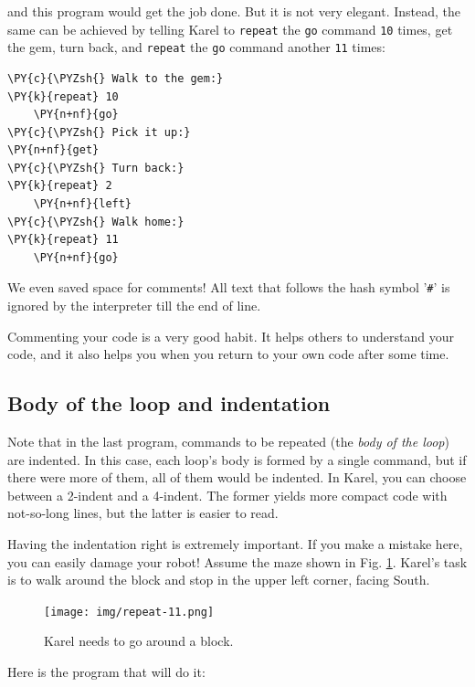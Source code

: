 \noindent
and this program would get the job done. But it is not very elegant. 
Instead, the same can be achieved by telling Karel to {\tt repeat} the {\tt go} 
command {\tt 10} times, get the gem, turn back, and  {\tt repeat} the {\tt go} 
command another {\tt 11} times:\\

\begin{bbox}
\begin{Verbatim}[commandchars=\\\{\}]
\PY{c}{\PYZsh{} Walk to the gem:}
\PY{k}{repeat} 10
    \PY{n+nf}{go}
\PY{c}{\PYZsh{} Pick it up:}
\PY{n+nf}{get}
\PY{c}{\PYZsh{} Turn back:}
\PY{k}{repeat} 2
    \PY{n+nf}{left}
\PY{c}{\PYZsh{} Walk home:}
\PY{k}{repeat} 11
    \PY{n+nf}{go}
\end{Verbatim}
\end{bbox}
\vspace{6mm}

\noindent
We even saved space for comments! All text that follows the hash symbol '{\tt \#}' 
is ignored by the interpreter till the end of line. \\

\begin{gbox}
\begin{center}
Commenting your code is a very good habit. It helps others to understand 
your code, and it also helps you when you return to your own code after some time.
\end{center}
\end{gbox}

\subsection{Body of the loop and indentation}

Note that in the last program, commands to be repeated (the {\em body of the loop}) 
are indented. In this case, each loop's body is formed by a single command, but if
there were more of them, all of them would be indented. In Karel, you can choose between 
a 2-indent and a 4-indent. The former yields more compact code with not-so-long lines, 
but the latter is easier to read. 

Having the indentation right is extremely important. If you make 
a mistake here, you can easily damage your robot! 
Assume the maze shown in Fig. \ref{fig:repeat-11}.
Karel's task is to walk around the block and stop in the 
upper left corner, facing South. 

\begin{figure}[!ht]
\begin{center}
\texttt{[image: img/repeat-11.png]}
\vspace{-0mm}
\caption{Karel needs to go around a block.}
\label{fig:repeat-11}
\end{center}
\end{figure}
\noindent
Here is the program that will do it:\\

